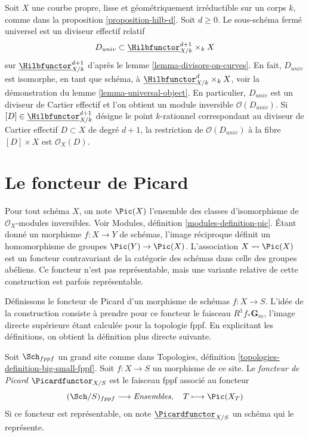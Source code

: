 \begin{remark}
\label{remark-universal-object-hilb-d}
Soit $X$ une courbe propre, lisse et géométriquement irréductible sur un corps $k$,
comme dans la proposition \ref{proposition-hilb-d}. Soit $d \geq 0$. Le sous-schéma
fermé universel est un diviseur effectif relatif
$$
D_{univ} \subset \underline{\Hilbfunctor}^{d + 1}_{X/k} \times_k X
$$
sur $\underline{\Hilbfunctor}^{d + 1}_{X/k}$ d'après le
lemme \ref{lemma-divisors-on-curves}.
En fait, $D_{univ}$ est isomorphe, en tant que schéma, à
$\underline{\Hilbfunctor}^d_{X/k} \times_k X$, voir la démonstration du
lemme \ref{lemma-universal-object}.
En particulier, $D_{univ}$ est un diviseur de Cartier effectif et
l'on obtient un module inversible
$\mathcal{O}(D_{univ})$. Si $[D] \in \underline{\Hilbfunctor}^{d + 1}_{X/k}$
désigne le point $k$-rationnel correspondant au diviseur de Cartier
effectif $D \subset X$ de degré $d + 1$, la restriction
de $\mathcal{O}(D_{univ})$ à la fibre $[D] \times X$ est
$\mathcal{O}_X(D)$.
\end{remark}


\section{Le foncteur de Picard}
\label{section-picard-functor}

\noindent
Pour tout schéma $X$, on note $\Pic(X)$ l'ensemble des classes
d'isomorphisme de $\mathcal{O}_X$-modules inversibles.
Voir Modules, définition \ref{modules-definition-pic}.
Étant donné un morphisme $f : X \to Y$ de schémas, l'image réciproque définit
un homomorphisme de groupes $\Pic(Y) \to \Pic(X)$.
L'association
$X \leadsto \Pic(X)$ est un foncteur contravariant de la catégorie
des schémas dans celle des groupes abéliens. Ce foncteur n'est pas
représentable, mais une variante relative de cette
construction est parfois représentable.

\medskip\noindent
Définissons le foncteur de Picard d'un morphisme de schémas $f : X \to S$.
L'idée de la construction consiste à prendre pour ce foncteur le faisceau
$R^1f_*\mathbf{G}_m$, l'image directe supérieure étant calculée pour
la topologie fppf. En explicitant les définitions, on obtient la définition
plus directe suivante.

\begin{definition}
\label{definition-picard-functor}
Soit $\Sch_{fppf}$ un grand site comme dans
Topologies, définition \ref{topologies-definition-big-small-fppf}.
Soit $f : X \to S$ un morphisme de ce site. Le {\it foncteur de Picard}
$\Picardfunctor_{X/S}$ est le faisceau fppf associé au foncteur
$$
(\Sch/S)_{fppf} \longrightarrow \textit{Ensembles},\quad
T \longmapsto \Pic(X_T)
$$
Si ce foncteur est représentable, on note
$\underline{\Picardfunctor}_{X/S}$ un schéma qui le représente.
\end{definition}

